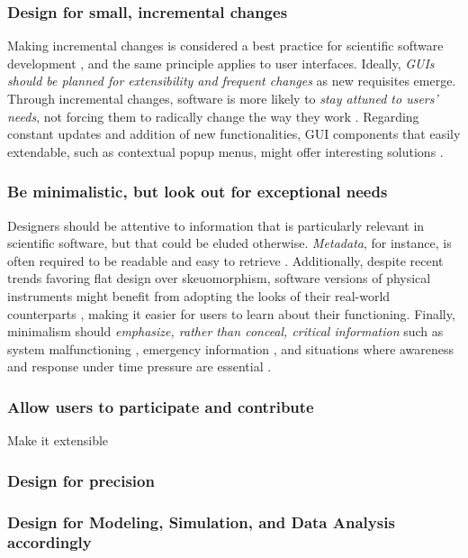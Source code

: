 \subsubsection{Design for small, incremental changes}
Making incremental changes is considered a best practice for scientific software development  \cite{bestprSC}, and the same principle applies to user interfaces. Ideally, \emph{GUIs should be planned for extensibility and frequent changes} as new requisites emerge. Through incremental changes, software is more likely to \emph{stay attuned to users' needs}, not forcing them to radically change the way they work \cite{DeRoure:2009}. Regarding constant updates and addition of new functionalities, GUI components that easily extendable, such as contextual popup menus, might offer interesting solutions \cite{MacLeod:1992}. 

\subsubsection{Be minimalistic, but look out for exceptional needs}

Designers should be attentive to information that is particularly relevant in scientific software, but that could be eluded otherwise. \emph{Metadata}, for instance, is often required to be readable and easy to retrieve  \cite{Talbott:2005, Baxter:2006, Macaulay:2009, Keefe:2010, DeMatos:2013, bestprSC, Thomer:2016}. Additionally, despite recent trends favoring flat design over skeuomorphism, software versions of physical instruments might benefit from adopting the looks of their real-world counterparts \cite{Foster:1998}, making it easier for users to learn about their functioning.  Finally, minimalism should \emph{emphasize, rather than conceal, critical information} such as system malfunctioning \cite{Morais:2014}, emergency information \cite{Ferguson:2016}, and situations where awareness and response under time pressure are essential \cite{Aragon:2008}.  


\subsubsection{Allow users to participate and contribute} Make it extensible

\subsubsection{Design for precision}

\subsubsection{Design for Modeling, Simulation, and Data Analysis accordingly}

